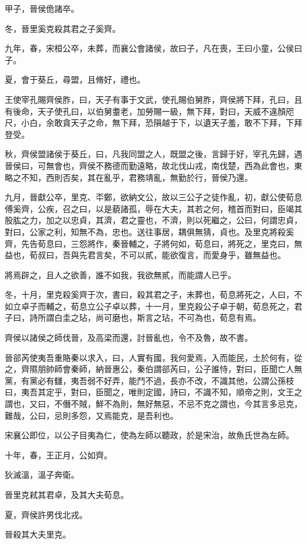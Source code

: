 \begin{pinyinscope}
甲子，晉侯佹諸卒。

冬，晉里奚克殺其君之子奚齊。

九年，春，宋桓公卒，未葬，而襄公會諸侯，故曰子，凡在喪，王曰小童，公侯曰子。

夏，會于葵丘，尋盟，且脩好，禮也。

王使宰孔賜齊侯胙，曰，天子有事于文武，使孔賜伯舅胙，齊侯將下拜，孔曰，且有後命，天子使孔曰，以伯舅耋老，加勞賜一級，無下拜，對曰，天威不違顏咫尺，小白，余敢貪天子之命，無下拜，恐隕越于下，以遺天子羞，敢不下拜，下拜登受。

秋，齊侯盟諸侯于葵丘，曰，凡我同盟之人，既盟之後，言歸于好，宰孔先歸，遇晉侯曰，可無會也，齊侯不務德而勤遠略，故北伐山戎，南伐楚，西為此會也，東略之不知，西則否矣，其在亂乎，君務靖亂，無勤於行，晉侯乃還。

九月，晉獻公卒，里克、㔻鄭，欲納文公，故以三公子之徒作亂，初，獻公使荀息傅奚齊，公疾，召之曰，以是藐諸孤，辱在大夫，其若之何，稽首而對曰，臣竭其股肱之力，加之以忠貞，其濟，君之靈也，不濟，則以死繼之，公曰，何謂忠貞，對曰，公家之利，知無不為，忠也。送往事居，耦俱無猜，貞也。及里克將殺奚齊，先告荀息曰，三怨將作，秦晉輔之，子將何如，荀息曰，將死之，里克曰，無益也，荀叔曰，吾與先君言矣，不可以貳，能欲復言，而愛身乎，雖無益也。

將焉辟之，且人之欲善，誰不如我，我欲無貳，而能謂人已乎。

冬，十月，里克殺奚齊于次，書曰，殺其君之子，未葬也，荀息將死之，人曰，不如立卓子而輔之，荀息立公子卓以葬，十一月，里克殺公子卓于朝，荀息死之，君子曰，詩所謂白圭之玷，尚可磨也，斯言之玷，不可為也，荀息有焉。

齊侯以諸侯之師伐晉，及高梁而還，討晉亂也，令不及魯，故不書。

晉郤芮使夷吾重賂秦以求入，曰，人實有國，我何愛焉，入而能民，土於何有，從之，齊隰朋帥師會秦師，納晉惠公，秦伯謂郤芮曰，公子誰恃，對曰，臣聞亡人無黨，有黨必有讎，夷吾弱不好弄，能鬥不過，長亦不改，不識其他，公謂公孫枝曰，夷吾其定乎，對曰，臣聞之，唯則定國，詩曰，不識不知，順帝之則，文王之謂也，又曰，不僭不賊，鮮不為則，無好無惡，不忌不克之謂也，今其言多忌克，難哉，公曰，忌則多怨，又焉能克，是吾利也。

宋襄公即位，以公子目夷為仁，使為左師以聽政，於是宋治，故魚氏世為左師。

十年，春，王正月，公如齊。

狄滅溫，溫子奔衛。

晉里克弒其君卓，及其大夫荀息。

夏，齊侯許男伐北戎。

晉殺其大夫里克。


\end{pinyinscope}
